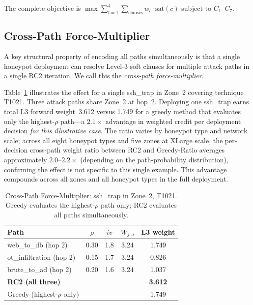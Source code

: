 \documentclass[journal]{IEEEtran}
\begin{document}
The complete objective is
$\max\sum_{l=1}^{4}\sum_\text{clauses}w_l\cdot\mathrm{sat}(c)$
subject to $C_1$--$C_7$.

\subsection{Cross-Path Force-Multiplier}
\label{sec:forcemult}

A key structural property of encoding all paths simultaneously is
that a single honeypot deployment can resolve Level-3 soft clauses
for multiple attack paths in a single RC2 iteration. We call this the
\emph{cross-path force-multiplier}.

Table~\ref{tab:forcemult} illustrates the effect for a single
ssh\_trap in Zone~2 covering technique T1021. Three attack paths
share Zone~2 at hop~2. Deploying one ssh\_trap earns total L3
forward weight~3.612 versus 1.749 for a greedy method that evaluates
only the highest-$\rho$ path---a $2.1\times$ advantage in weighted
credit per deployment decision \emph{for this illustrative case}.
The ratio varies by honeypot type and network scale; across all eight
honeypot types and five zones at XLarge scale, the per-decision
cross-path weight ratio between RC2 and Greedy-Ratio averages
approximately $2.0$--$2.2\times$ (depending on the path-probability
distribution), confirming the effect is not specific to this single
example. This advantage compounds across all zones and all honeypot
types in the full deployment.

\begin{table}[t]
\caption{Cross-Path Force-Multiplier: ssh\_trap in Zone~2, T1021.
  Greedy evaluates the highest-$\rho$ path only; RC2 evaluates all
  paths simultaneously.}
\label{tab:forcemult}
\centering
\renewcommand{\arraystretch}{1.2}
\begin{tabular}{lcccc}
\toprule
Path & $\rho$ & $iv$ & $W_{j,a}$ & L3 weight \\
\midrule
web\_to\_db (hop 2)       & 0.30 & 1.8 & 3.24 & 1.749 \\
ot\_infiltration (hop 2)  & 0.15 & 1.7 & 3.24 & 0.826 \\
brute\_to\_ad (hop 2)     & 0.20 & 1.6 & 3.24 & 1.037 \\
\midrule
\textbf{RC2 (all three)} & & & & \textbf{3.612} \\
Greedy (highest-$\rho$ only) & & & & 1.749 \\
\bottomrule
\end{tabular}
\end{table}
\end{document}
